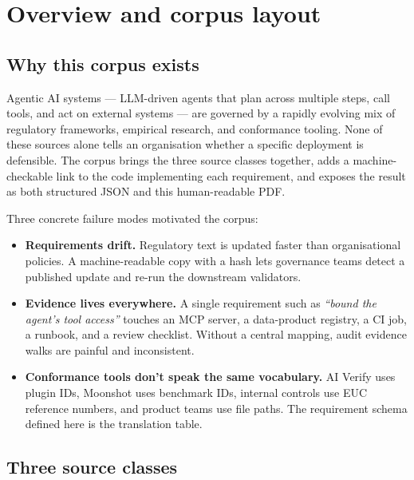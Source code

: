 \chapter{Overview and corpus layout}
\label{ch:overview}

\section{Why this corpus exists}

Agentic AI systems --- LLM-driven agents that plan across multiple steps,
call tools, and act on external systems --- are governed by a rapidly
evolving mix of regulatory frameworks, empirical research, and conformance
tooling. None of these sources alone tells an organisation whether a
specific deployment is defensible. The \corpus{} corpus brings the three
source classes together, adds a machine-checkable link to the code
implementing each requirement, and exposes the result as both structured
JSON and this human-readable PDF.

Three concrete failure modes motivated the corpus:

\begin{itemize}
  \item \textbf{Requirements drift.} Regulatory text is updated faster than
        organisational policies. A machine-readable copy with a hash lets
        governance teams detect a published update and re-run the
        downstream validators.
  \item \textbf{Evidence lives everywhere.} A single requirement such as
        \emph{``bound the agent's tool access''} touches an MCP server, a
        data-product registry, a CI job, a runbook, and a review checklist.
        Without a central mapping, audit evidence walks are painful and
        inconsistent.
  \item \textbf{Conformance tools don't speak the same vocabulary.} AI
        Verify uses plugin IDs, Moonshot uses benchmark IDs, internal
        controls use EUC reference numbers, and product teams use file
        paths. The requirement schema defined here is the translation
        table.
\end{itemize}

\section{Three source classes}

